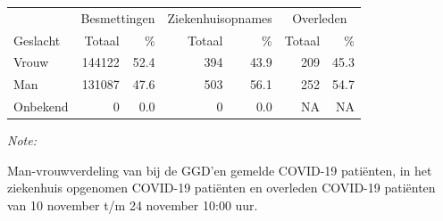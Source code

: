 \documentclass[
  english,
  man,floatsintext]{apa6}
\begin{document}
\begin{table}
\centering\begingroup\fontsize{11}{13}\selectfont

\begin{threeparttable}
\begin{tabular}{lrrrrrr}
\toprule
\multicolumn{1}{c}{ } & \multicolumn{2}{c}{Besmettingen} & \multicolumn{2}{c}{Ziekenhuisopnames} & \multicolumn{2}{c}{Overleden} \\
\cmidrule(l{3pt}r{3pt}){2-3} \cmidrule(l{3pt}r{3pt}){4-5} \cmidrule(l{3pt}r{3pt}){6-7}
Geslacht & Totaal & \% & Totaal & \% & Totaal & \%\\
\midrule
Vrouw & 144122 & 52.4 & 394 & 43.9 & 209 & 45.3\\
Man & 131087 & 47.6 & 503 & 56.1 & 252 & 54.7\\
Onbekend & 0 & 0.0 & 0 & 0.0 & NA & NA\\
\bottomrule
\end{tabular}
\begin{tablenotes}
\item \textit{Note: } 
\item Man-vrouwverdeling van bij de GGD’en gemelde COVID-19 patiënten, in het ziekenhuis opgenomen COVID-19 patiënten en overleden COVID-19 patiënten van 10 november t/m 24 november 10:00 uur.
\end{tablenotes}
\end{threeparttable}
\endgroup{}
\end{table}
\newpage
\end{document}

